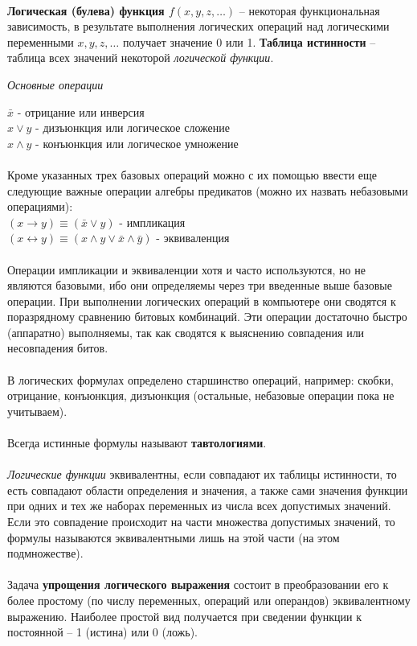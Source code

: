 \\
\textbf{Логическая (булева) функция $f(x, y, z, …)$} -- некоторая функциональная зависимость, в результате выполнения логических операций над логическими переменными $x, y, z,\dots$ получает значение 0 или 1.
\textbf{Таблица истинности} -- таблица всех значений некоторой \emph{логической функции}.
\begin{center}
  \emph{Основные операции}
\end{center}
$\bar{x}$ - отрицание или инверсия
\\$x \vee y$ - дизъюнкция или логическое сложение
\\$x \wedge y$ - конъюнкция или логическое умножение\\
\\Кроме указанных трех базовых операций можно с их помощью ввести еще следующие важные операции алгебры предикатов (можно их назвать небазовыми операциями):\\
$(x\to y) \equiv (\bar{x} \vee y)$ - импликация \\
$(x\leftrightarrow y) \equiv (x \wedge y \vee \bar{x} \wedge \bar{y})$ - эквиваленция\\
\\Операции импликации и эквиваленции хотя и часто используются, но не являются базовыми, ибо они определяемы через три введенные выше базовые операции. При выполнении логических операций в компьютере они сводятся к поразрядному сравнению битовых комбинаций. Эти операции достаточно быстро (аппаратно) выполняемы, так как сводятся к выяснению совпадения или несовпадения битов.\\
\\В логических формулах определено старшинство операций, например: скобки, отрицание, конъюнкция, дизъюнкция (остальные, небазовые операции пока не учитываем).\\
\\Всегда истинные формулы называют \textbf{тавтологиями}.\\
\\\emph{Логические функции} эквивалентны, если совпадают их таблицы истинности, то есть совпадают области определения и значения, а также сами значения функции при одних и тех же наборах переменных из числа всех допустимых значений. Если это совпадение происходит на части множества допустимых значений, то формулы называются эквивалентными лишь на этой части (на этом подмножестве).\\
\\Задача \textbf{упрощения логического выражения} состоит в преобразовании его к более простому (по числу переменных, операций или операндов) эквивалентному выражению. Наиболее простой вид получается при сведении функции к постоянной – 1 (истина) или 0 (ложь).


